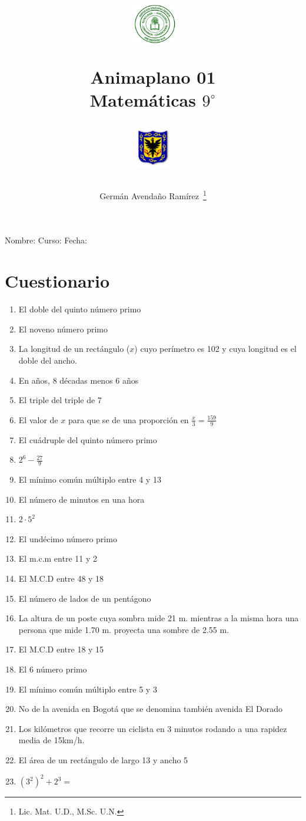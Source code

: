 \documentclass[letterpaper,11pt,twoside]{article}
\author{Germ\'an Avenda\~no Ram\'irez~\thanks{Lic. Mat. U.D., M.Sc. U.N.}}
\title{\begin{minipage}{.2\textwidth}
\includegraphics[height=1.75cm]{Images/logo-colegio.png}\end{minipage}
\begin{minipage}{.55\textwidth}
\begin{center}
Animaplano 01\\
Matemáticas $9^{\circ}$
\end{center}
\end{minipage}\hfill
\begin{minipage}{.2\textwidth}
\includegraphics[height=1.75cm]{Images/logo-sed.png} 
\end{minipage}}
\date{}
\begin{document}
\maketitle
Nombre: \hrulefill Curso: \underline{\hspace*{44pt}} Fecha: \underline{\hspace*{2.5cm}}
\section*{Cuestionario}
\begin{enumerate}
\item El doble del quinto n\'{u}mero primo
\item El noveno n\'{u}mero primo
\item La longitud de un rect\'{a}ngulo ($x$) cuyo per\'{i}metro es 102 y cuya longitud es el doble del ancho.
\item En años, 8 décadas menos 6 años
\item El triple del triple de 7
\item El valor de $x$ para que se de una proporci\'{o}n en $\frac{x}{3}=\frac{159}{9}$
\item El cuádruple del quinto número primo
\item $2^{6}-\frac{27}{9}$
\item El mínimo común múltiplo entre 4 y 13
\item El número de minutos en una hora
\item $2\cdot 5^{2}$
\item El undécimo número primo
\item El m.c.m entre 11 y 2
\item El M.C.D entre 48 y 18
\item El número de lados de un pentágono
\item La altura de un poste cuya sombra mide 21 m. mientras a la misma hora una persona que mide 1.70 m. proyecta una sombre de 2.55 m.
\item El M.C.D entre 18 y 15
\item El 6 número primo
\item El mínimo común múltiplo entre 5 y 3
\item No de la avenida en Bogotá que se denomina también avenida El Dorado
\item Los kilómetros que recorre un ciclista en 3 minutos rodando a una rapidez media de 15km/h.
\item El área de un rectángulo de largo 13 y ancho 5
\item $(3^{2})^{2}+2^{3}=$

\end{enumerate}
\end{document}
